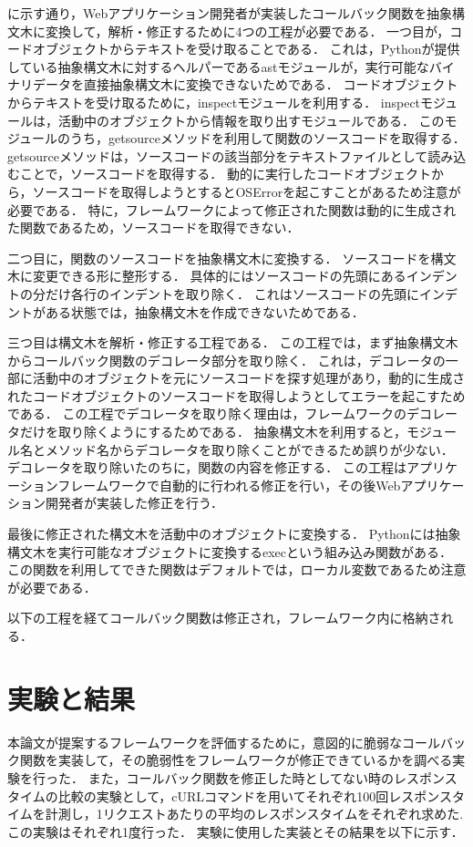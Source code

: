 \documentclass[submit]{ipsj}
\begin{document}
に示す通り，Webアプリケーション開発者が実装したコールバック関数を抽象構文木に変換して，解析・修正するために4つの工程が必要である．
一つ目が，コードオブジェクトからテキストを受け取ることである．
これは，Pythonが提供している抽象構文木に対するヘルパーであるastモジュールが，実行可能なバイナリデータを直接抽象構文木に変換できないためである．
コードオブジェクトからテキストを受け取るために，inspect\cite{inspect}モジュールを利用する．
inspectモジュールは，活動中のオブジェクトから情報を取り出すモジュールである．
このモジュールのうち，getsourceメソッドを利用して関数のソースコードを取得する．
getsourceメソッドは，ソースコードの該当部分をテキストファイルとして読み込むことで，ソースコードを取得する．
動的に実行したコードオブジェクトから，ソースコードを取得しようとするとOSErrorを起こすことがあるため注意が必要である．
特に，フレームワークによって修正された関数は動的に生成された関数であるため，ソースコードを取得できない．

二つ目に，関数のソースコードを抽象構文木に変換する．
ソースコードを構文木に変更できる形に整形する．
具体的にはソースコードの先頭にあるインデントの分だけ各行のインデントを取り除く．
これはソースコードの先頭にインデントがある状態では，抽象構文木を作成できないためである．

三つ目は構文木を解析・修正する工程である．
この工程では，まず抽象構文木からコールバック関数のデコレータ部分を取り除く．
これは，デコレータの一部に活動中のオブジェクトを元にソースコードを探す処理があり，動的に生成されたコードオブジェクトのソースコードを取得しようとしてエラーを起こすためである．
この工程でデコレータを取り除く理由は，フレームワークのデコレータだけを取り除くようにするためである．
抽象構文木を利用すると，モジュール名とメソッド名からデコレータを取り除くことができるため誤りが少ない．
デコレータを取り除いたのちに，関数の内容を修正する．
この工程はアプリケーションフレームワークで自動的に行われる修正を行い，その後Webアプリケーション開発者が実装した修正を行う．

最後に修正された構文木を活動中のオブジェクトに変換する．
Pythonには抽象構文木を実行可能なオブジェクトに変換するexec\cite{exec}という組み込み関数がある．
この関数を利用してできた関数はデフォルトでは，ローカル変数であるため注意が必要である．

以下の工程を経てコールバック関数は修正され，フレームワーク内に格納される．

\section{実験と結果}
本論文が提案するフレームワークを評価するために，意図的に脆弱なコールバック関数を実装して，その脆弱性をフレームワークが修正できているかを調べる実験を行った．
また，コールバック関数を修正した時としてない時のレスポンスタイムの比較の実験として，cURLコマンドを用いてそれぞれ100回レスポンスタイムを計測し，1リクエストあたりの平均のレスポンスタイムをそれぞれ求めた.
この実験はそれぞれ1度行った．
実験に使用した実装とその結果を以下に示す．
\end{document}
